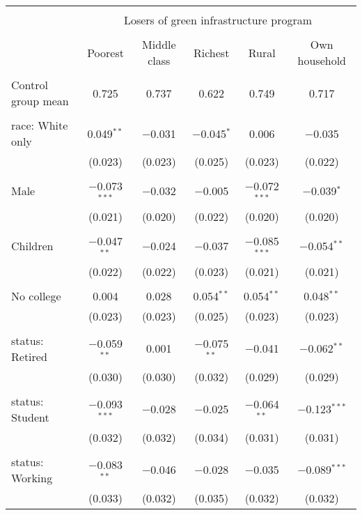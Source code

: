 
\begin{tabular}{@{\extracolsep{5pt}}lccccc} 
\\[-1.8ex]\hline 
\hline \\[-1.8ex] 
 & \multicolumn{5}{c}{Losers of green infrastructure program} \\ 
\cline{2-6} 
\\[-1.8ex] & Poorest & Middle class & Richest & Rural & Own household \\ 
\hline \\[-1.8ex] 
 Control group mean & 0.725 & 0.737 & 0.622 & 0.749 & 0.717  \\ \hline \\[-1.8ex] race: White only & 0.049$^{**}$ & $-$0.031 & $-$0.045$^{*}$ & 0.006 & $-$0.035 \\ 
  & (0.023) & (0.023) & (0.025) & (0.023) & (0.022) \\ 
  & & & & & \\ 
 Male & $-$0.073$^{***}$ & $-$0.032 & $-$0.005 & $-$0.072$^{***}$ & $-$0.039$^{*}$ \\ 
  & (0.021) & (0.020) & (0.022) & (0.020) & (0.020) \\ 
  & & & & & \\ 
 Children & $-$0.047$^{**}$ & $-$0.024 & $-$0.037 & $-$0.085$^{***}$ & $-$0.054$^{**}$ \\ 
  & (0.022) & (0.022) & (0.023) & (0.021) & (0.021) \\ 
  & & & & & \\ 
 No college & 0.004 & 0.028 & 0.054$^{**}$ & 0.054$^{**}$ & 0.048$^{**}$ \\ 
  & (0.023) & (0.023) & (0.025) & (0.023) & (0.023) \\ 
  & & & & & \\ 
 status: Retired & $-$0.059$^{**}$ & 0.001 & $-$0.075$^{**}$ & $-$0.041 & $-$0.062$^{**}$ \\ 
  & (0.030) & (0.030) & (0.032) & (0.029) & (0.029) \\ 
  & & & & & \\ 
 status: Student & $-$0.093$^{***}$ & $-$0.028 & $-$0.025 & $-$0.064$^{**}$ & $-$0.123$^{***}$ \\ 
  & (0.032) & (0.032) & (0.034) & (0.031) & (0.031) \\ 
  & & & & & \\ 
 status: Working & $-$0.083$^{**}$ & $-$0.046 & $-$0.028 & $-$0.035 & $-$0.089$^{***}$ \\ 
  & (0.033) & (0.032) & (0.035) & (0.032) & (0.032) \\ 

\end{tabular}
